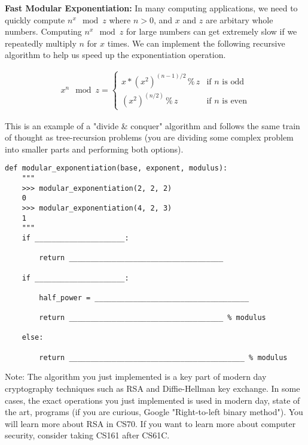 \begin{blocksection}
    \question \textbf{Fast Modular Exponentiation:} In many computing applications, we need to quickly compute $n^{x} \mod z $ where $n > 0$, and $x$ and $z$ are arbitary whole numbers. Computing $n^{x} \mod z$ for large numbers can get extremely slow if we repeatedly multiply $n$ for $x$ times. We can implement the following recursive algorithm to help us speed up the exponentiation operation.

    \begin{gather*}
        x^{n} \mod z = 
        \begin{cases}
            x * (x^{2})^{(n-1)/2} \, \% \, z & \text{if $n$ is odd}\\
            (x^{2})^{(n/2)} \, \% \, z & \text{if $n$ is even}
        \end{cases}
    \end{gather*}

    This is an example of a "divide \& conquer" algorithm and follows the same train of thought as tree-recursion problems (you are dividing some complex problem into smaller parts and performing both options).
    
    \begin{lstlisting}
def modular_exponentiation(base, exponent, modulus):
    """
    >>> modular_exponentiation(2, 2, 2)
    0
    >>> modular_exponentiation(4, 2, 3)
    1
    """
    if _____________________:

        return ____________________________________

    if _____________________:
            
        half_power = ____________________________________

        return ____________________________________ % modulus

    else:  

        return _________________________________________ % modulus
    \end{lstlisting}

    Note: The algorithm you just implemented is a key part of modern day cryptography techniques such as RSA and Diffie-Hellman key exchange. In some cases, the exact operations you just implemented is used in modern day, state of the art, programs (if you are curious, Google "Right-to-left binary method"). You will learn more about RSA in CS70. If you want to learn more about computer security, consider taking CS161 after CS61C.
    \end{blocksection}
    
